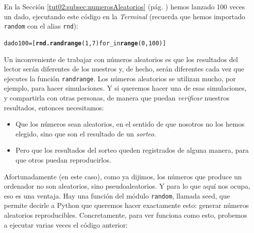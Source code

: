 \documentclass[10pt,a4paper]{article}\usepackage[]{graphicx}\usepackage[]{color}
\makeatletter
\newcommand{\hlkwd}[1]{\textcolor[rgb]{0.737,0.353,0.396}{\textbf{#1}}}%
\newenvironment{kframe}{%
 \def\at@end@of@kframe{}%
 \ifinner\ifhmode%
  \def\at@end@of@kframe{\end{minipage}}%
  \begin{minipage}{\columnwidth}%
 \fi\fi%
 \def\FrameCommand##1{\hskip\@totalleftmargin \hskip-\fboxsep
 \colorbox{shadecolor}{##1}\hskip-\fboxsep
     \hskip-\linewidth \hskip-\@totalleftmargin \hskip\columnwidth}%
 \MakeFramed {\advance\hsize-\width
   \@totalleftmargin\z@ \linewidth\hsize
   \@setminipage}}%
 {\par\unskip\endMakeFramed%
 \at@end@of@kframe}
\newenvironment{knitrout}{}{} %
\makeatother
\begin{document}
En la  Sección \ref{tut02:subsec:numerosAleatorios} (pág. \pageref{tut02:subsec:numerosAleatorios}) hemos lanzado 100 veces un dado,  ejecutando este código en la {\em Terminal} (recuerda que hemos importado {\tt random} con el alias {\tt rnd}):
\begin{knitrout}
\color{fgcolor}\begin{kframe}
\begin{alltt}
dado100 = [\hlkwd{rnd.randrange}(1, 7) for _ in \hlkwd{range}(0, 100)]
\end{alltt}
\end{kframe}
\end{knitrout}
Un inconveniente de trabajar con números aleatorios es que los resultados del lector serán diferentes de los nuestros y, de hecho, serán diferentes cada vez que ejecutes la función {\tt randrange}. Los números aleatorios se utilizan mucho, por ejemplo, para hacer simulaciones. Y si queremos hacer una de esas simulaciones, y compartirla con otras personas, de manera que puedan {\em verificar} nuestros resultados, entonces necesitamos:
\begin{itemize}
  \item Que los números sean aleatorios, en el sentido de que nosotros no los hemos elegido, sino que son el resultado de un {\em sorteo}.
  \item Pero que los resultados del sorteo queden registrados de alguna manera, para que otros puedan reproducirlos.
\end{itemize}
Afortunadamente (en este caso), como ya dijimos, los números que produce un ordenador no son aleatorios, sino pseudoaleatorios. Y para lo que aquí nos ocupa, eso es una ventaja. Hay una función del módulo {\tt random}, llamada {\sf seed}, que permite decirle a Python que queremos hacer exactamente esto: generar números aleatorios reproducibles. Concretamente, para ver funciona como esto, probemos a ejecutar varias veces el código anterior:
\end{document}
